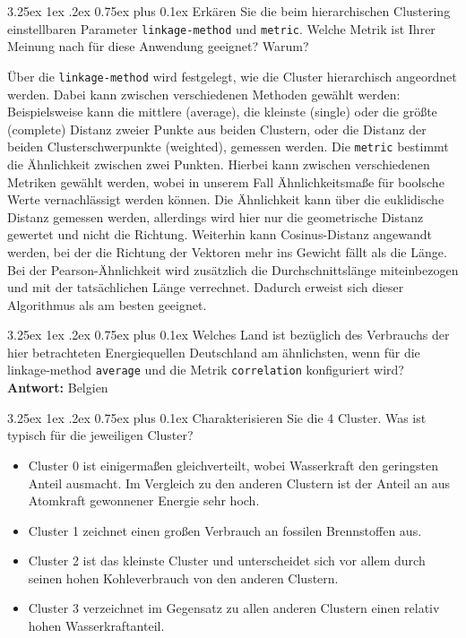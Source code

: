 \documentclass[12pt,a4paper]{scrartcl}
\makeatletter
\renewcommand\subparagraph{\@startsection{subparagraph}{5}{\parindent}%
    {3.25ex \@plus1ex \@minus .2ex}%
    {0.75ex plus 0.1ex}%
    {\normalfont\normalsize\bfseries}}
\makeatother
\begin{document}
\subparagraph{Erk\"aren Sie die beim hierarchischen Clustering einstellbaren Parameter \lstinline{linkage-method} und \lstinline{metric}. Welche Metrik ist Ihrer Meinung nach f\"ur diese Anwendung geeignet? Warum?}

\"Uber die \lstinline{linkage-method} wird festgelegt, wie die Cluster hierarchisch angeordnet werden. Dabei kann zwischen verschiedenen Methoden gew\"ahlt werden: Beispielsweise kann die mittlere (average), die kleinste (single) oder die gr\"o\ss te (complete) Distanz zweier Punkte aus beiden Clustern, oder die Distanz der beiden Clusterschwerpunkte (weighted), gemessen werden. 
Die \lstinline{metric}  bestimmt die \"Ahnlichkeit zwischen zwei Punkten. Hierbei kann zwischen verschiedenen Metriken gew\"ahlt werden, wobei in unserem Fall \"Ahnlichkeitsma\ss e f\"ur boolsche Werte vernachl\"assigt werden k\"onnen. 
Die \"Ahnlichkeit kann \"uber die euklidische Distanz gemessen werden, allerdings wird hier nur die geometrische Distanz gewertet und nicht die Richtung. Weiterhin kann Cosinus-Distanz angewandt werden, bei der die Richtung der Vektoren mehr ins Gewicht f\"allt als die L\"ange. 
Bei der Pearson-\"Ahnlichkeit wird zus\"atzlich die Durchschnittsl\"ange miteinbezogen und mit der tats\"achlichen L\"ange verrechnet. Dadurch erweist sich dieser Algorithmus als am besten geeignet. 


\subparagraph{Welches Land ist bez\"uglich des Verbrauchs der hier betrachteten Energiequellen Deutschland am \"ahnlichsten, wenn f\"ur die linkage-method \lstinline{average} und die Metrik \lstinline{correlation} konfiguriert wird?}
\textbf{Antwort:} Belgien

\subparagraph{Charakterisieren Sie die 4 Cluster. Was ist typisch f\"ur die jeweiligen Cluster?}
\begin{itemize}
\item Cluster 0 ist einigerma\ss en gleichverteilt, wobei Wasserkraft den geringsten Anteil ausmacht. Im Vergleich zu den anderen Clustern ist der Anteil an aus Atomkraft gewonnener Energie sehr hoch. 
\item Cluster 1 zeichnet einen gro\ss en Verbrauch an fossilen Brennstoffen aus.
\item Cluster 2 ist das kleinste Cluster und unterscheidet sich vor allem durch seinen hohen Kohleverbrauch von den anderen Clustern.
\item Cluster 3 verzeichnet im Gegensatz zu allen anderen Clustern einen relativ hohen Wasserkraftanteil. 
\end{itemize}
\end{document}
